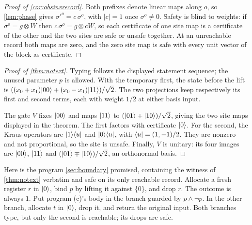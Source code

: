 \documentclass[acmsmall,screen,review,anonymous,nonacm]{acmart}
\begin{document}
\begin{proof}[Proof of \cref{cor:obsinvrecord}]
Both prefixes denote linear maps along $o$, so \cref{lem:phase} gives
${\sigma'}^{o} = c\,\sigma^{o}$, with $|c| = 1$ once $\sigma^{o} \ne 0$.
Safety is blind to weights: if $\sigma^{o} = g \otimes W$ then
$c\,\sigma^{o} = g \otimes cW$, so each certificate of one site map is a certificate
of the other and the two sites are safe or unsafe together.
At an unreachable record both maps are zero, and the zero site map is safe with
every unit vector of the block as certificate.
\end{proof}

\begin{proof}[Proof of \cref{thm:notext}]
Typing follows the displayed statement sequence; the unused parameter
$p$ is allowed. With the temporary first, the state before the lift is
$((x_0+x_1)\lvert 00 \rangle+(x_0-x_1)\lvert 11 \rangle)/\sqrt2$.
The two projections keep respectively its first and second terms, each
with weight $1/2$ at either basis input.

The gate $V$ fixes $\lvert 00 \rangle$ and maps $\lvert 11 \rangle$ to
$(\lvert 01 \rangle+\lvert 10 \rangle)/\sqrt2$, giving the two site maps displayed in the
theorem. The first factors with certificate $\lvert 0 \rangle$. For the second,
the Kraus operators are $\lvert 1 \rangle\langle u \rvert$ and $\lvert 0 \rangle\langle u \rvert$, with
$\langle u \rvert=(1,-1)/2$. They are nonzero and not proportional, so the site
is unsafe. Finally, $V$ is unitary: its four images are $\lvert 00 \rangle$,
$\lvert 11 \rangle$ and $(\lvert 01 \rangle\mp\lvert 10 \rangle)/\sqrt2$, an orthonormal basis.
\end{proof}

Here is the program \cref{sec:boundary} promised, containing the witness of
\cref{thm:notext} verbatim and safe on its only reachable record.
Allocate a fresh register $r$ in $\lvert 0 \rangle$, bind $p$ by
lifting it against $\{0\}$, and drop $r$. The outcome is always $1$.
Put program (c)'s body in the branch guarded by $p\wedge\neg p$.
In the other branch, allocate $t$ in $\lvert 0 \rangle$, drop it, and return the
original input. Both branches type, but only the second is reachable;
its drops are safe.
\end{document}
